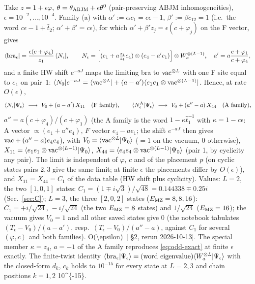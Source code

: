 Take $z=1+\epsilon\varphi$, $\theta=\theta_{\rm ABJM}+\epsilon\theta^0$ (pair-preserving ABJM inhomogeneities), $\epsilon=10^{-2},\dots,10^{-4}$.
Family (a) with $\alpha':=\alpha c_1=c\epsilon-1$, $\beta':=\beta c_{12}=1$ (i.e.\ the word $c\epsilon-1+\hat t_2$; $\alpha'+\beta'=c\epsilon$), for which
$\alpha'+\beta'z_j=\epsilon(c+\varphi_j)$ on the F vector, gives
\begin{equation}
 \langle\mathrm{bra}_\epsilon|=\frac{\epsilon(c+\varphi_4)}{z_1}\,\langle N_\epsilon|,\qquad
 N_\epsilon=\Big[(e_1+a\tfrac{z_1}{z_4}e_4)\otimes(e_4-a'e_1)\Big]\otimes W_a^{\otimes(L-1)},\quad
 a'=a\frac{c+\varphi_1}{c+\varphi_4},
\end{equation}
and a finite HW shift $e^{-aJ}$ maps the limiting bra to $\mathrm{vac}^{\otimes L}$ with one F site equal to $e_1$ on pair~1:
$\langle N_0|e^{-aJ}=\langle\mathrm{vac}^{\otimes L}|+(a-a')\langle e_1e_1\otimes\mathrm{vac}^{\otimes(L-1)}|$. Hence, at rate $O(\epsilon)$,
\begin{equation}\label{eq:odd-limit}
 \braket{N_\epsilon}{\Psi_\epsilon}\ \longrightarrow\ V_0+(a-a')\,X_{11}\quad(\text{F family}),\qquad
 \braket{N^{\rm A}_\epsilon}{\Psi_\epsilon}\ \longrightarrow\ V_0+(a''-a)\,X_{44}\quad(\text{A family}),
\end{equation}
$a''=a(c+\varphi_4)/(c+\varphi_1)$ (the A family is the word $1-\kappa\hat t_1^{-1}$ with $\kappa=1-c\epsilon$: A vector $\propto(e_1+a''e_4)$, $F$ vector $e_4-ae_1$;
the shift $e^{-aJ}$ then gives $\mathrm{vac}+(a''-a)e_4e_4$), with $V_0=\langle\mathrm{vac}^{\otimes L}|\Psi_0\rangle$ ($=1$ on the vacuum, $0$ otherwise),
$X_{11}=\langle e_1e_1\otimes\mathrm{vac}^{\otimes(L-1)}|\Psi_0\rangle$, $X_{44}=\langle e_4e_4\otimes\mathrm{vac}^{\otimes(L-1)}|\Psi_0\rangle$ (pair 1, by cyclicity any pair).
The limit is independent of $\varphi$, $c$ and of the placement $p$ (on cyclic states pairs $2,3$ give the same limit; at finite $\epsilon$ the
placements differ by $O(\epsilon)$), and $X_{11}=X_{44}=C_1$ of the data table (HW shift plus cyclicity). Values:
$L=2$, the two $[1,0,1]$ states: $C_1=(1\mp i\sqrt3)/\sqrt{48}=0.144338\mp0.25i$ (Sec.~\ref{sec:C});
$L=3$, the three $[2,0,2]$ states ($E_{\rm MZ}=8,8,16$): $C_1=+i/\sqrt{24},\,-i/\sqrt{24}$ (the two $E_{\rm MZ}=8$ states) and $1/\sqrt{24}$ ($E_{\rm MZ}=16$);
the vacuum gives $V_0=1$ and all other saved states give $0$ (the notebook tabulates $(T_\epsilon-V_0)/(a-a')$, resp.\ $(T_\epsilon-V_0)/(a''-a)$, against $C_1$ for
several $(\varphi,c)$ and both families). \num{O(\epsilon)}\ [ \S2, rerun 2026-10-13]. The special member $\kappa=z_4$, $a=-1$ of the A family reproduces
\eqref{eq:odd-exact} at finite $\epsilon$ exactly. The finite-twist identity
$\langle\mathrm{bra}_\epsilon|\Psi_\epsilon\rangle=(\text{word eigenvalue})\langle W_a^{\otimes L}|\Psi_\epsilon\rangle$ with the closed-form $d_k$, $c_k$ holds to
$10^{-15}$ for every state at $L=2,3$ and chain positions $k=1,2$ \num{10^{-15}}.

